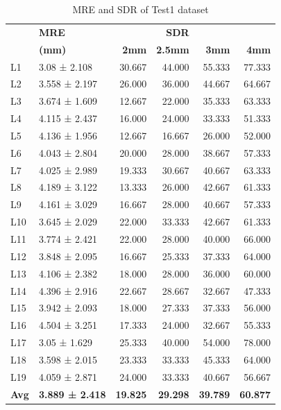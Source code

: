 \documentclass[sn-mathphys]{sn-jnl}%
\theoremstyle{thmstyleone}%
\theoremstyle{thmstyletwo}%
\theoremstyle{thmstylethree}%
\begin{document}
\begin{table}[ht!]
\centering
\begin{tabular}{llrrrr}
\toprule
&                \textbf{MRE}         &            &  \textbf{SDR} &\\
    &             \textbf{(mm)}&       \textbf{2mm} &       \textbf{2.5mm} &       \textbf{3mm}&       \textbf{4mm} \\
\midrule
  L1 &   3.08 ± 2.108 &  30.667 &  44.000 &  55.333 &  77.333 \\
  L2 &  3.558 ± 2.197 &  26.000 &  36.000 &  44.667 &  64.667 \\
  L3 &  3.674 ± 1.609 &  12.667 &  22.000 &  35.333 &  63.333 \\
  L4 &  4.115 ± 2.437 &  16.000 &  24.000 &  33.333 &  51.333 \\
  L5 &  4.136 ± 1.956 &  12.667 &  16.667 &  26.000 &  52.000 \\
  L6 &  4.043 ± 2.804 &  20.000 &  28.000 &  38.667 &  57.333 \\
  L7 &  4.025 ± 2.989 &  19.333 &  30.667 &  40.667 &  63.333 \\
  L8 &  4.189 ± 3.122 &  13.333 &  26.000 &  42.667 &  61.333 \\
  L9 &  4.161 ± 3.029 &  16.667 &  28.000 &  40.667 &  57.333 \\
 L10 &  3.645 ± 2.029 &  22.000 &  33.333 &  42.667 &  61.333 \\
 L11 &  3.774 ± 2.421 &  22.000 &  28.000 &  40.000 &  66.000 \\
 L12 &  3.848 ± 2.095 &  16.667 &  25.333 &  37.333 &  64.000 \\
 L13 &  4.106 ± 2.382 &  18.000 &  28.000 &  36.000 &  60.000 \\
 L14 &  4.396 ± 2.916 &  22.667 &  28.667 &  32.667 &  47.333 \\
 L15 &  3.942 ± 2.093 &  18.000 &  27.333 &  37.333 &  56.000 \\
 L16 &  4.504 ± 3.251 &  17.333 &  24.000 &  32.667 &  55.333 \\
 L17 &   3.05 ± 1.629 &  25.333 &  40.000 &  54.000 &  78.000 \\
 L18 &  3.598 ± 2.015 &  23.333 &  33.333 &  45.333 &  64.000 \\
 L19 &  4.059 ± 2.871 &  24.000 &  33.333 &  40.667 &  56.667 \\
 \textbf{Avg} &  \textbf{3.889 ± 2.418} &  \textbf{19.825} & \textbf{ 29.298} &  \textbf{39.789 } & \textbf{60.877} \\
\bottomrule
\end{tabular}
\caption{MRE and SDR of Test1 dataset}
\label{table:4.1}
\end{table}
\end{document}
